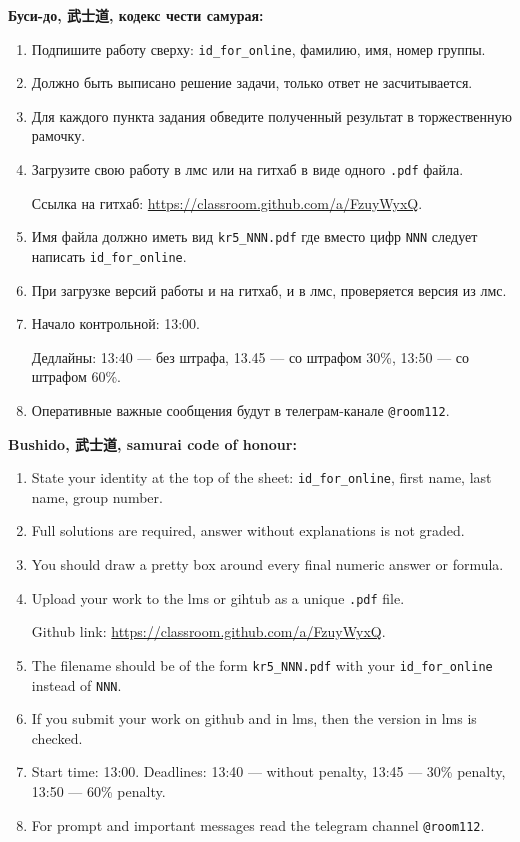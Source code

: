 \documentclass[12pt]{article}
\begin{document}
\vspace{20mm}

\textbf{Буси-до, 武士道, кодекс чести самурая:}

\vspace{5mm}

\begin{enumerate}
\item Подпишите работу сверху: \verb|id_for_online|, фамилию, имя, номер группы.
\item Должно быть выписано решение задачи, только ответ не засчитывается.
\item Для каждого пункта задания обведите полученный результат в торжественную рамочку.
\item Загрузите свою работу в лмс или на гитхаб в виде одного \verb|.pdf| файла.

Ссылка на гитхаб: \url{https://classroom.github.com/a/FzuyWyxQ}.
\item Имя файла должно иметь вид \verb|kr5_NNN.pdf| где вместо цифр \verb|NNN| следует написать \verb|id_for_online|.
\item При загрузке версий работы и на гитхаб, и в лмс, проверяется версия из лмс. 
\item Начало контрольной: 13:00. 

Дедлайны: 13:40 — без штрафа, 13.45 — со штрафом 30\%, 13:50 — со штрафом 60\%.
\item Оперативные важные сообщения будут в телеграм-канале \verb|@room112|.
\end{enumerate}

\vspace{10mm}

\textbf{Bushido, 武士道, samurai code of honour:}

\vspace{5mm}

\begin{enumerate}
\item State your identity at the top of the sheet: \verb|id_for_online|, first name, last name, group number.
\item Full solutions are required, answer without explanations is not graded. 
\item You should draw a pretty box around every final numeric answer or formula.
\item Upload your work to the lms or gihtub as a unique \verb|.pdf| file.

Github link: \url{https://classroom.github.com/a/FzuyWyxQ}.
\item The filename should be of the form \verb|kr5_NNN.pdf| with your \verb|id_for_online| instead of \verb|NNN|.
\item If you submit your work on github and in lms, then the version in lms is checked.
\item Start time: 13:00. Deadlines: 13:40 — without penalty, 13:45 — 30\% penalty, 13:50 — 60\% penalty.
\item For prompt and important messages read the telegram channel \verb|@room112|.
\end{enumerate}
\end{document}
